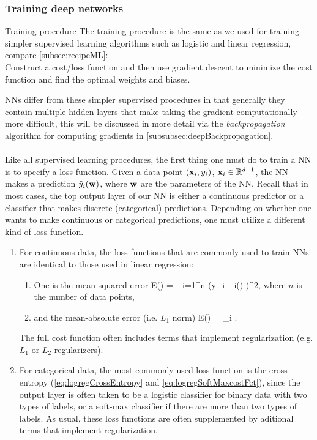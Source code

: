 \subsubsection{Training deep networks}
\label{subsubsec:deepTraining}
\begin{mybox}{Training procedure}
	The training procedure is the same as we used for training simpler supervised learning algorithms such as logistic and linear regression, compare \ref{subsec:recipeML}:\\
	Construct a cost/loss function and then use gradient descent to minimize the cost function and find the optimal weights and biases. 
\end{mybox}
NNs differ from these simpler supervised procedures in that generally they contain multiple hidden layers that make taking the gradient computationally more difficult, this will be discussed in more detail via the \emph{backpropagation} algorithm for computing gradients in \ref{subsubsec:deepBackpropagation}.\\
\\
Like all supervised learning procedures, the first thing one must do to train a NN is to specify a loss function. Given a data point $(\textbf{x}_i,y_i)$, $\textbf{x}_i \in \mathbb{R}^{d+1}$, the NN makes a prediction $\hat{y}_i(\textbf{w})$, where $\textbf{w}$ are the parameters of the NN. Recall that in most cases, the top output layer of our NN is either a continuous predictor or a classifier that makes discrete (categorical) predictions. Depending on whether one wants to make continuous or categorical predictions, one must utilize a different kind of loss function.
\begin{enumerate} 
\item For continuous data, the loss functions that are commonly used to train NNs are identical to those used in linear regression:
\begin{enumerate}
	\item One is the mean squared error
	\be 
	\label{eq:deepCostSquaredError}
	E(\tw) = \sum_{i=1}^n (y_i-_i(\tw) )^2, 
	\ee 
	where $n$ is the number of data points,
	\item and the mean-absolute error (i.e. $L_1$ norm) 
	\be 
	\label{eq:deepCostAbsoluteError} 
	E(\tw) =  \sum_i .
		\ee 
\end{enumerate}
The full cost function often includes terms that implement regularization (e.g. $L_1$ or $L_2$ regularizers).
\item For categorical data, the most commonly used loss function is the cross-entropy (\ref{eq:logregCrossEntropy} and \ref{eq:logregSoftMaxcostFct}), since the output layer is often taken to be a logistic classifier for binary data with two types of labels, or a soft-max classifier if there are more than two types of labels. As usual, these loss functions are often supplemented by aditional terms that implement regularization.
\end{enumerate}
